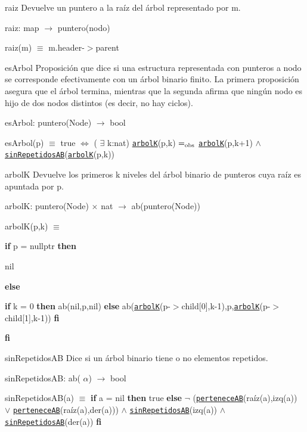 \begin{DoxyParagraph}{raiz}
Devuelve un puntero a la raíz del árbol representado por m.

raiz\-: map $\to$ puntero(nodo) \par
raiz(m) $\equiv$ m.\-header-\/$>$parent


\end{DoxyParagraph}
\begin{DoxyParagraph}{es\-Arbol}
Proposición que dice si una estructura representada con punteros a nodo se corresponde efectivamente con un árbol binario finito. La primera proposición asegura que el árbol termina, mientras que la segunda afirma que ningún nodo es hijo de dos nodos distintos (es decir, no hay ciclos).

es\-Arbol\-: puntero(\-Node) $\to$ bool \par
es\-Arbol(p) $\equiv$ true $\Leftrightarrow$ ( $\exists$ k\-:nat) \href{axiomas.html#arbolK}{\tt arbol\-K}(p,k) $=_{\rm obs}$ \href{axiomas.html#arbolK}{\tt arbol\-K}(p,k+1) $\land$ \href{axiomas.html#sinRepetidosAB}{\tt sin\-Repetidos\-A\-B}(\href{axiomas.html#arbolK}{\tt arbol\-K}(p,k))


\end{DoxyParagraph}
\begin{DoxyParagraph}{arbol\-K}
Devuelve los primeros k niveles del árbol binario de punteros cuya raíz es apuntada por p.

arbol\-K\-: puntero(\-Node) $\times$ nat $\to$ ab(puntero(\-Node)) \par
arbol\-K(p,k) $\equiv$ \par
 {\bfseries if} p = nullptr {\bfseries then} \par
 nil \par
 {\bfseries else} \par
{\bfseries if} k = 0 {\bfseries then} ab(nil,p,nil) {\bfseries else} ab(\href{axiomas.html#arbolK}{\tt arbol\-K}(p-\/$>$child\mbox{[}0\mbox{]},k-\/1),p,\href{axiomas.html#arbolK}{\tt arbol\-K}(p-\/$>$child\mbox{[}1\mbox{]},k-\/1)) {\bfseries fi} \par
 {\bfseries fi} 


\end{DoxyParagraph}
\begin{DoxyParagraph}{sin\-Repetidos\-A\-B}
Dice si un árbol binario tiene o no elementos repetidos.

sin\-Repetidos\-A\-B\-: ab( $\alpha$) $\to$ bool \par
sin\-Repetidos\-A\-B(a) $\equiv$ {\bfseries if} a = nil {\bfseries then} true {\bfseries else} $\lnot$ (\href{axiomas.html#perteneceAB}{\tt pertenece\-A\-B}(raíz(a),izq(a)) $\lor$ \href{axiomas.html#perteneceAB}{\tt pertenece\-A\-B}(raíz(a),der(a))) $\land$ \href{axiomas.html#sinRepetidosAB}{\tt sin\-Repetidos\-A\-B}(izq(a)) $\land$ \href{axiomas.html#sinRepetidosAB}{\tt sin\-Repetidos\-A\-B}(der(a)) {\bfseries fi} 


\end{DoxyParagraph}
